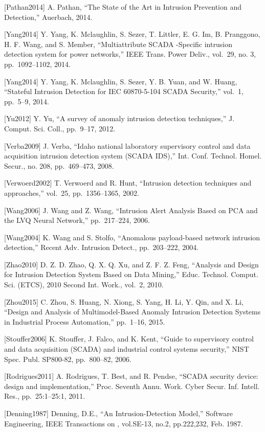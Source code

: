 \documentclass[12pt,]{article}
\begin{document}
{[}Pathan2014{]} A. Pathan, ``The State of the Art in Intrusion
Prevention and Detection,'' Auerbach, 2014.

{[}Yang2014{]} Y. Yang, K. Mclaughlin, S. Sezer, T. Littler, E. G. Im,
B. Pranggono, H. F. Wang, and S. Member, ``Multiattribute SCADA
-Specific intrusion detection system for power networks,'' IEEE Trans.
Power Deliv., vol.~29, no. 3, pp.~1092--1102, 2014.

{[}Yang2014{]} Y. Yang, K. Mclaughlin, S. Sezer, Y. B. Yuan, and W.
Huang, ``Stateful Intrusion Detection for IEC 60870-5-104 SCADA
Security,'' vol.~1, pp.~5--9, 2014.

{[}Yu2012{]} Y. Yu, ``A survey of anomaly intrusion detection
techniques,'' J. Comput. Sci. Coll., pp.~9--17, 2012.

{[}Verba2009{]} J. Verba, ``Idaho national laboratory supervisory
control and data acquisition intrusion detection system (SCADA IDS),''
Int. Conf. Technol. Homel. Secur., no. 208, pp.~469--473, 2008.

{[}Verwoerd2002{]} T. Verwoerd and R. Hunt, ``Intrusion detection
techniques and approaches,'' vol.~25, pp.~1356--1365, 2002.

{[}Wang2006{]} J. Wang and Z. Wang, ``Intrusion Alert Analysis Based on
PCA and the LVQ Neural Network,'' pp.~217--224, 2006.

{[}Wang2004{]} K. Wang and S. Stolfo, ``Anomalous payload-based network
intrusion detection,'' Recent Adv. Intrusion Detect., pp.~203--222,
2004.

{[}Zhao2010{]} D. Z. D. Zhao, Q. X. Q. Xu, and Z. F. Z. Feng, ``Analysis
and Design for Intrusion Detection System Based on Data Mining,'' Educ.
Technol. Comput. Sci. (ETCS), 2010 Second Int. Work., vol.~2, 2010.

{[}Zhou2015{]} C. Zhou, S. Huang, N. Xiong, S. Yang, H. Li, Y. Qin, and
X. Li, ``Design and Analysis of Multimodel-Based Anomaly Intrusion
Detection Systems in Industrial Process Automation,'' pp.~1--16, 2015.

{[}Stouffer2006{]} K. Stouffer, J. Falco, and K. Kent, ``Guide to
supervisory control and data acquisition (SCADA) and industrial control
systems security,'' NIST Spec. Publ. SP800-82, pp.~800--82, 2006.

{[}Rodrigues2011{]} A. Rodrigues, T. Best, and R. Pendse, ``SCADA
security device: design and implementation,'' Proc. Seventh Annu. Work.
Cyber Secur. Inf. Intell. Res., pp.~25:1--25:1, 2011.

{[}Denning1987{]} Denning, D.E., ``An Intrusion-Detection Model,''
Software Engineering, IEEE Transactions on , vol.SE-13, no.2,
pp.222,232, Feb. 1987.
\end{document}
